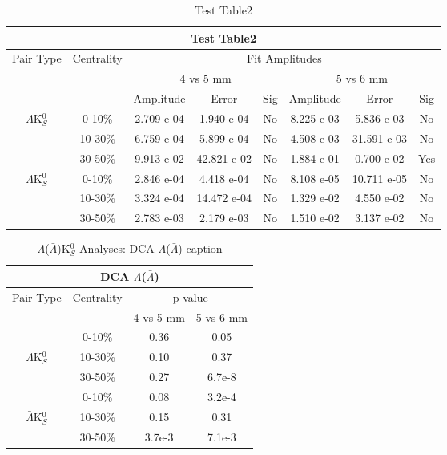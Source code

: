 \documentclass[../AnalysisNoteJBuxton.tex]{subfiles}
\begin{document}
\begin{table}
 \centering
 \begin{tabular}{|c|c|c|c|c||c|c|c|}
  \multicolumn{8}{c}{Test Table2} \\
  \hline
  \multirow{2}{*}{Pair Type} & \multirow{2}{*}{Centrality} & \multicolumn{6}{c|}{Fit Amplitudes} \\
  \cline{3-8}
   & & \multicolumn{3}{c||}{4 vs 5 mm} & \multicolumn{3}{c|}{5 vs 6 mm} \\
  \hline
   & & Amplitude & Error & Sig & Amplitude & Error & Sig \\
  \hline  
  \multirow{3}{*}{$\Lambda$K$^{0}_{S}$}  
   & 0-10\% & 2.709 e-04 & 1.940 e-04 & No & 8.225 e-03 & 5.836 e-03 & No \\
   & 10-30\% & 6.759 e-04 & 5.899 e-04 & No & 4.508 e-03 & 31.591 e-03 & No \\
   & 30-50\% & 9.913 e-02 & 42.821 e-02 & No & 1.884 e-01 & 0.700 e-02 & Yes\\
  \hline  
  \multirow{3}{*}{$\bar{\Lambda}$K$^{0}_{S}$}  
   & 0-10\% & 2.846 e-04 & 4.418 e-04 & No & 8.108 e-05 & 10.711 e-05 & No \\
   & 10-30\% & 3.324 e-04 & 14.472 e-04 & No & 1.329 e-02 & 4.550 e-02 & No \\
   & 30-50\% & 2.783 e-03 & 2.179 e-03 & No & 1.510 e-02 & 3.137 e-02 & No \\ 
  \hline
 \end{tabular}
 \caption{Test Table2}
 \label{tab:Test2}
\end{table}


\begin{table}
 \centering
 \begin{tabular}{|c|c|c|c|}
  \multicolumn{4}{c}{DCA $\Lambda$($\bar{\Lambda}$)} \\
  \hline
  Pair Type & Centrality & \multicolumn{2}{c|}{p-value} \\
  \cline{3-4}
   & & 4 vs 5 mm & 5 vs 6 mm \\
  \hline
   & 0-10\% & 0.36 & 0.05 \\
  $\Lambda$K$^{0}_{S}$ 
   & 10-30\% & 0.10 & 0.37 \\
   & 30-50\% & 0.27 & 6.7e-8 \\
  \hline
   & 0-10\% & 0.08 & 3.2e-4 \\
  $\bar{\Lambda}$K$^{0}_{S}$ 
   & 10-30\% & 0.15 & 0.31 \\
   & 30-50\% & 3.7e-3 & 7.1e-3 \\
  \hline
 \end{tabular}
 \caption{$\Lambda$($\bar{\Lambda}$)K$^{0}_{S}$ Analyses: DCA $\Lambda$($\bar{\Lambda}$) caption}
 \label{tab:LamDcaLamK0}
\end{table}
\end{document}
